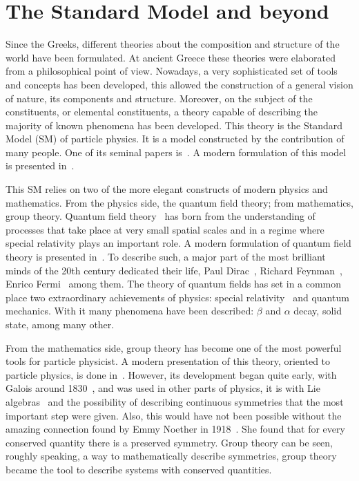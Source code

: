 \chapter[The Standard Model]{The Standard Model and beyond}
\label{chap:SM}
Since the Greeks, different theories about the composition and structure of the world have been formulated. At ancient Greece these theories were elaborated from a philosophical point of view. Nowadays, a very sophisticated set of tools and concepts has been developed, this allowed the construction of a general vision of nature, its components and structure. Moreover, on the subject of the constituents, or elemental constituents, a theory capable of describing the majority of known phenomena has been developed. This theory is the Standard Model (SM) of particle physics. It is a model constructed by the contribution of many people. One of its seminal papers is~\cite{PhysRevLett.19.1264}. A modern formulation of this model is presented in~\cite{Griffiths:2008zz}. 

This SM relies on two of the more elegant constructs of modern physics and mathematics. From the physics side, the quantum field theory; from mathematics, group theory. Quantum field theory~\cite{RevModPhys.13.203} has born from the understanding of processes that take place at very small spatial scales and in a regime where special relativity plays an important role. A modern formulation of quantum field theory is presented in~\cite{Maggiore:2005qv,Lahiri:2005sm}. To describe such, a major part of the most brilliant minds of the 20th century dedicated their life, Paul Dirac~\cite{Dirac:1927dy}, Richard Feynman~\cite{Feynman:1950ir}, Enrico Fermi~\cite{Fermi:1934hr} among them. The theory of quantum fields has set in a common place two extraordinary achievements of physics: special relativity~\cite{Einstein:1905ve} and quantum mechanics. With it many phenomena have been described: $\beta$ and $\alpha$ decay, solid state, among many other.

From the mathematics side, group theory has become one of the most powerful tools for particle physicist. A modern presentation of this theory, oriented to particle physics, is done in~\cite{Georgi:1999wka}. However, its development began quite early, with Galois around 1830~\cite{Galois:2013}, and was used in other parts of physics, it is with Lie algebras~\cite{Georgi:1999wka} and the possibility of describing continuous symmetries that the most important step were given. Also, this would have not been possible without the amazing connection found by Emmy Noether in 1918~\cite{1971TTSP....1..186N}. She found that for every conserved quantity there is a preserved symmetry. Group theory can be seen, roughly speaking, a way to mathematically describe symmetries, group theory became the tool to describe systems with conserved quantities. 

